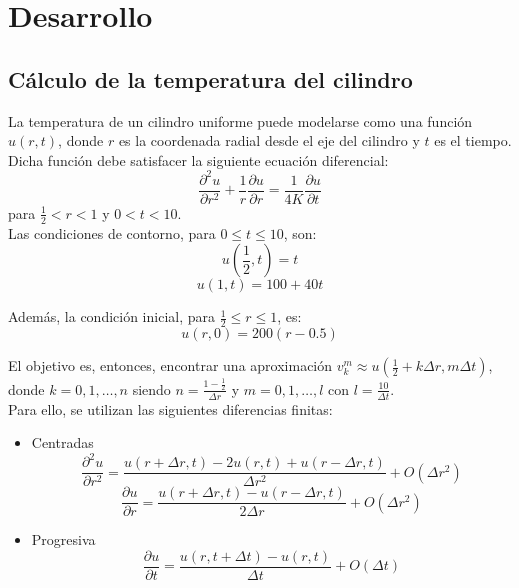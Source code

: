 \documentclass[journal, monochrome]{IEEEtran}
\begin{document}
\section{Desarrollo}
\label{section:development}
\vspace{0.5cm}
\subsection{Cálculo de la temperatura del cilindro}

La temperatura de un cilindro uniforme puede modelarse como una función $u(r,t)$, donde $r$ es la coordenada radial desde el eje del cilindro y $t$ es el tiempo. Dicha función debe satisfacer la siguiente ecuación diferencial:
\begin{equation}
\frac{\partial^{2} u}{\partial r^{2}} + \frac{1}{r} \frac{\partial u}{\partial r} = \frac{1}{4K} \frac{\partial u}{\partial t}
\label{equation:diff}
\end{equation}
para $\frac{1}{2} < r < 1$ y $0< t < 10$. \\

Las condiciones de contorno, para $0 \leq t \leq 10$, son: \\
\begin{equation}
u(\frac{1}{2}, t) = t
\label{equation:contour1}
\end{equation}
\begin{equation}
u(1, t) = 100 + 40t
\label{equation:contour2}
\end{equation}


Además, la condición inicial, para $\frac{1}{2} \leq r \leq 1$, es:
\begin{equation}
u(r, 0) = 200(r-0.5)
\label{equation:initial}
\end{equation}


El objetivo es, entonces, encontrar una aproximación $v_{k}^{m} \approx u(\frac{1}{2} + k\Delta r, m\Delta t)$, donde $k = 0,1,\dots,n$ 
siendo $n = \frac{1-\frac{1}{2}}{\Delta r}$ y $m = 0,1,\dots,l$ con $l = \frac{10}{\Delta t}$. \\

Para ello, se utilizan las siguientes diferencias finitas:
\begin{itemize}
\item Centradas \\
\begin{equation}
\frac{\partial^{2} u}{\partial r^{2}} = \frac{u(r+\Delta r, t) - 2 u(r,t) + u(r-\Delta r,t)}{\Delta r^{2}} + O(\Delta r^{2})
\end{equation}
\begin{equation}
\frac{\partial u}{\partial r} = \frac{u(r+\Delta r, t) - u(r-\Delta r,t)}{2\Delta r} + O(\Delta r^{2})
\end{equation}
\item Progresiva \\
\begin{equation}
\frac{\partial u}{\partial t} = \frac{u(r, t + \Delta t) - u(r,t)}{\Delta t} + O(\Delta t)
\end{equation}
\end{itemize}
\end{document}
